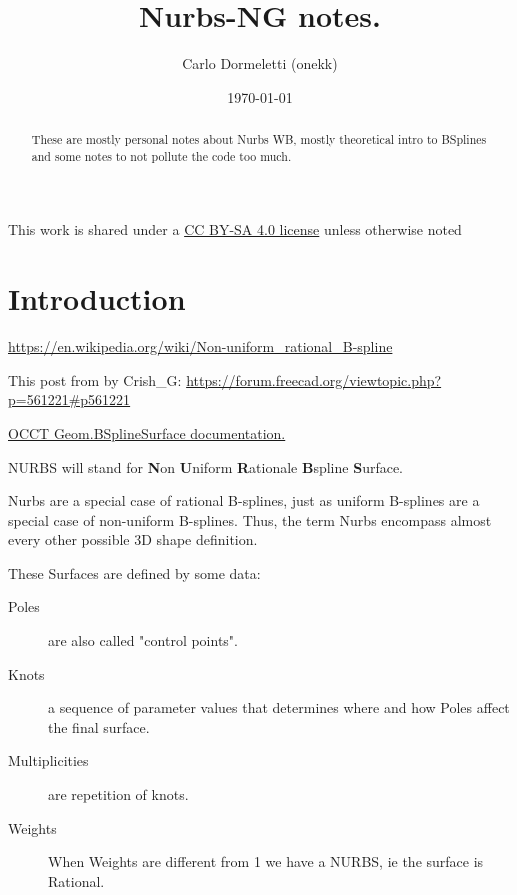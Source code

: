 \documentclass[a4paper]{article}
\begin{document}
\title{Nurbs-NG notes.}
\author{Carlo Dormeletti (onekk)}

\date{
\today
}

\maketitle

\begin{abstract}
   These are mostly personal notes about Nurbs WB, mostly theoretical intro to BSplines and some
   notes to not pollute the code too much.
\end{abstract}

This work is shared under a \href{https://creativecommons.org/licenses/by-sa/4.0/}{CC BY-SA 4.0 license} unless otherwise noted

\tableofcontents

\section{Introduction}
\label{sec:intro}


\href{https://en.wikipedia.org/wiki/Non-uniform_rational_B-spline}{https://en.wikipedia.org/wiki/Non-uniform\_rational\_B-spline}

\bigskip
This post from by Crish\_G:
\href{https://forum.freecad.org/viewtopic.php?p=561221#p561221}{https://forum.freecad.org/viewtopic.php?p=561221\#p561221}

\bigskip
\href{http://www.opencascade.com/doc/occt-6.9.0/refman/html/class_geom___b_spline_surface.html}{OCCT Geom.BSplineSurface documentation.}


\bigskip


NURBS will stand for \textbf{N}on \textbf{U}niform \textbf{R}ationale \textbf{B}spline \textbf{S}urface.

Nurbs are a special case of rational B-splines, just as uniform B-splines are a special case of non-uniform B-splines. Thus, the term Nurbs encompass almost every other possible 3D shape definition.

These Surfaces are defined by some data:

\begin{description}
  \item[Poles] are also called "control points".
  \item[Knots] a sequence of parameter values that determines where and how Poles affect the final surface.
  \item[Multiplicities] are repetition of knots.
  \item[Weights] When Weights are different from 1 we have a NURBS, ie the surface is Rational.
\end{description}
\end{document}
